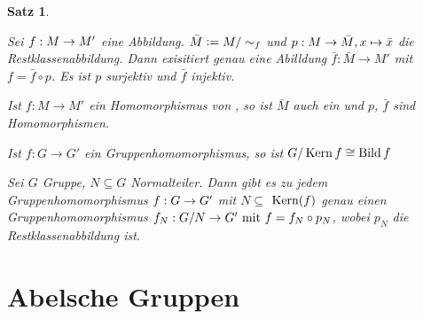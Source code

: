 \documentclass[a4paper,10pt,german]{scrbook}
\theoremstyle{saetze}
\newtheorem{Satz}{Satz}
\theoremstyle{definitionen}
\begin{document}
\begin{Satz}
\label{Satz 1}
\mbox{}
\begin{enum}
\item 
Sei $f: M \rightarrow M'$ eine Abbildung. $\bar M \mathrel{\mathop:}=
M/\sim_f$ und $p: M \rightarrow \bar M, x \mapsto \bar x$ die
Restklassenabbildung.
Dann exisitiert genau eine Abilldung $\bar f: \bar M \to M'$ mit $f = \bar f\circ p$. Es ist $p$ surjektiv und $\bar f$ injektiv.

\item Ist $f:M \to M'$ ein Homomorphismus von \bla, so ist $\bar M$ auch ein \bla und $p$, $\bar f$ sind Homomorphismen.

\item {} \newline
Ist $f:G \to G'$ ein Gruppenhomomorphismus, so ist $G/\mathop{\rm Kern}\nolimits f \cong \mathop{\rm Bild}\nolimits f$
\item {} \newline
Sei $G$ Gruppe, $N \subseteq G$ Normalteiler. Dann gibt es zu jedem
Gruppenhomomorphismus $f:G \rightarrow G'$ mit $N \subseteq$ $\mathop{\rm Kern}\nolimits(f)$ genau
einen Gruppenhomomorphismus $f_N: G/N \rightarrow G' \mbox{ mit } f = f_N \circ p_N$, wobei $p_N$ die Restklassenabbildung ist.
\end{enum} \noindent

\end{Satz}

\section{Abelsche Gruppen}
\end{document}

